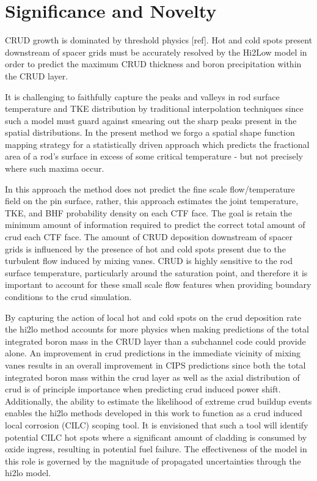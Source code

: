 \section{Significance and Novelty}

CRUD growth is dominated by threshold physics [ref].  Hot and cold spots
present downstream of spacer grids must be accurately resolved by the Hi2Low model
in order to predict the maximum CRUD
thickness and boron precipitation within the CRUD layer.  

It is challenging to faithfully capture the peaks and valleys in
rod surface temperature and TKE distribution by traditional interpolation
techniques since such a model must guard against smearing out the sharp peaks
present in the spatial distributions.  
In the present method we forgo a spatial shape function mapping strategy
for a statistically driven approach which predicts the fractional
area of a rod's surface in excess of some critical temperature - but not
precisely where such maxima occur.

In this approach the method does not predict the fine scale flow/temperature field on the pin surface, rather, this approach estimates the joint temperature, TKE, and BHF probability density on each CTF face.  The goal is retain the minimum amount of information required to predict the correct total amount of crud each CTF face.  The amount of CRUD deposition downstream of spacer grids is influenced by the presence of hot and cold spots present due to the turbulent flow induced by mixing vanes.  CRUD is highly sensitive to the rod surface temperature, particularly around the saturation point, and therefore it is important to account for these small scale flow features when providing boundary conditions to the crud simulation.

By capturing the action of local hot and cold spots on the crud deposition rate the hi2lo method accounts for more physics when making predictions of the total integrated boron mass in the CRUD layer than a subchannel code could provide alone.  An improvement in crud predictions in the immediate vicinity of mixing vanes results in an overall improvement in CIPS predictions since both the total integrated boron mass within the crud layer as well as the axial distribution of crud is of principle importance when predicting crud induced power shift.  Additionally, the ability to estimate the likelihood of extreme crud buildup events enables the hi2lo methods developed in this work to function as a crud induced local corrosion (CILC) scoping tool.  It is envisioned that such a tool will identify potential CILC hot spots where a significant amount of cladding is consumed by oxide ingress, resulting in potential fuel failure.  The effectiveness of the model in this role is governed by the magnitude of propagated uncertainties through the hi2lo model.

